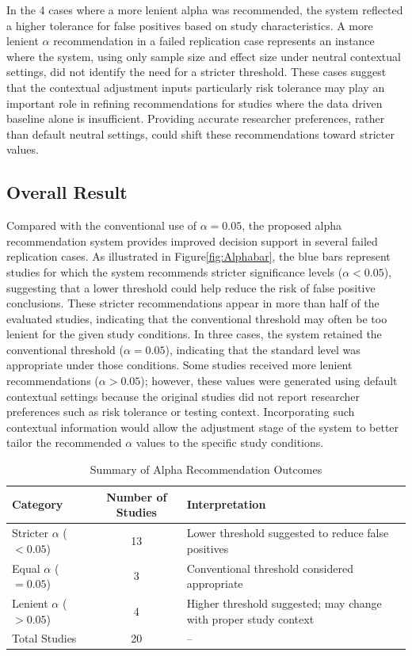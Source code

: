 In the 4 cases where a more lenient alpha was recommended, the system reflected a higher tolerance for false positives based on study characteristics. A more lenient $\alpha$ recommendation in a failed replication 
case represents an instance where the system, using only sample 
size and effect size under neutral contextual settings, did not 
identify the need for a stricter threshold. These cases suggest 
that the contextual adjustment inputs particularly risk 
tolerance may play an important role in refining 
recommendations for studies where the data driven baseline alone 
is insufficient. Providing accurate researcher preferences, 
rather than default neutral settings, could shift these 
recommendations toward stricter values.

\subsection{Overall Result}

Compared with the conventional use of $\alpha = 0.05$, the proposed alpha recommendation system provides improved decision support in several failed replication cases. As illustrated in Figure\ref{fig:Alphabar}, the blue bars represent studies for which the system recommends stricter significance levels ($\alpha < 0.05$), suggesting that a lower threshold could help reduce the risk of false positive conclusions. These stricter recommendations appear in more than half of the evaluated studies, indicating that the conventional threshold may often be too lenient for the given study conditions. In three cases, the system retained the conventional threshold ($\alpha = 0.05$), indicating that the standard level was appropriate under those conditions. Some studies received more lenient recommendations ($\alpha > 0.05$); however, these values were generated using default contextual settings because the original studies did not report researcher preferences such as risk tolerance or testing context. Incorporating such contextual information would allow the adjustment stage of the system to better tailor the recommended $\alpha$ values to the specific study conditions.

\begin{table}[h]
	\centering
	\caption{Summary of Alpha Recommendation Outcomes}
	\begin{tabular}{l c p{5cm}}
		\hline
		Category & Number of Studies & Interpretation \\
		\hline
		Stricter $\alpha$ ($<0.05$) & 13 & Lower threshold suggested to reduce false positives \\
		Equal $\alpha$ ($=0.05$) & 3 & Conventional threshold considered appropriate \\
		Lenient $\alpha$ ($>0.05$) & 4 & Higher threshold suggested; may change with proper study context \\
		\hline
		Total Studies & 20 & -- \\
		\hline
	\end{tabular}
\end{table}
